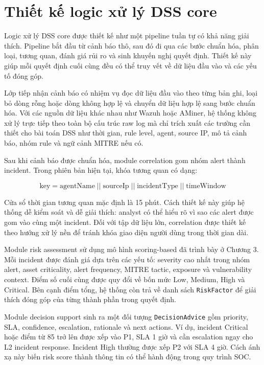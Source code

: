 \documentclass[a4paper,12pt,oneside]{book}
\begin{document}
\section{Thiết kế logic xử lý DSS core}
{\fontsize{13pt}{15.6pt}\selectfont

Logic xử lý DSS core được thiết kế như một pipeline tuần tự có khả năng giải thích. Pipeline bắt đầu từ cảnh báo thô, sau đó đi qua các bước chuẩn hóa, phân loại, tương quan, đánh giá rủi ro và sinh khuyến nghị quyết định. Thiết kế này giúp mỗi quyết định cuối cùng đều có thể truy vết về dữ liệu đầu vào và các yếu tố đóng góp.

\noindent Lớp tiếp nhận cảnh báo có nhiệm vụ đọc dữ liệu đầu vào theo từng bản ghi, loại bỏ dòng rỗng hoặc dòng không hợp lệ và chuyển dữ liệu hợp lệ sang bước chuẩn hóa. Với các nguồn dữ liệu khác nhau như Wazuh hoặc AMiner, hệ thống không xử lý trực tiếp theo toàn bộ cấu trúc raw log mà chỉ trích xuất các trường cần thiết cho bài toán DSS như thời gian, rule level, agent, source IP, mô tả cảnh báo, nhóm rule và ngữ cảnh MITRE nếu có.

\noindent Sau khi cảnh báo được chuẩn hóa, module correlation gom nhóm alert thành incident. Trong phiên bản hiện tại, khóa tương quan có dạng:

\[
\mathrm{key} = \mathrm{agentName} \; || \; \mathrm{sourceIp} \; || \; \mathrm{incidentType} \; || \; \mathrm{timeWindow}
\]

Cửa sổ thời gian tương quan mặc định là 15 phút. Cách thiết kế này giúp hệ thống dễ kiểm soát và dễ giải thích: analyst có thể hiểu rõ vì sao các alert được gom vào cùng một incident. Đối với tập dữ liệu lớn, correlation được thiết kế theo hướng xử lý nền để tránh khóa giao diện người dùng trong thời gian dài.

\noindent Module risk assessment sử dụng mô hình scoring-based đã trình bày ở Chương 3. Mỗi incident được đánh giá dựa trên các yếu tố: severity cao nhất trong nhóm alert, asset criticality, alert frequency, MITRE tactic, exposure và vulnerability context. Điểm số cuối cùng được quy đổi về bốn mức Low, Medium, High và Critical. Bên cạnh điểm tổng, hệ thống còn trả về danh sách \texttt{RiskFactor} để giải thích đóng góp của từng thành phần trong quyết định.

\noindent Module decision support sinh ra một đối tượng \texttt{DecisionAdvice} gồm priority, SLA, confidence, escalation, rationale và next actions. Ví dụ, incident Critical hoặc điểm từ 85 trở lên được xếp vào P1, SLA 1 giờ và cần escalation ngay cho L2 incident response. Incident High thường được xếp P2 với SLA 4 giờ. Cách ánh xạ này biến risk score thành thông tin có thể hành động trong quy trình SOC.

}
\end{document}
